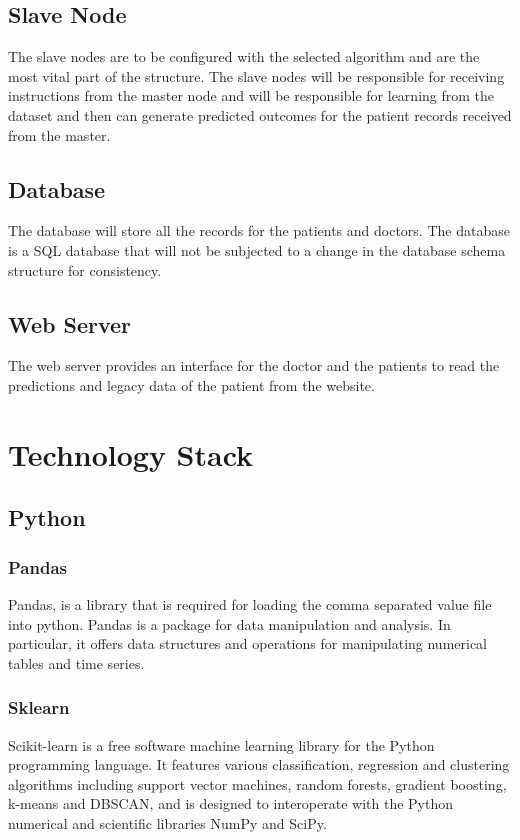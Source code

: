\documentclass[12pt]{article}
\begin{document}
\subsection{Slave Node}
The slave nodes are to be configured with the selected algorithm and are the most vital part of the structure. The slave nodes will be responsible for receiving instructions from the master node and will be responsible for learning from the dataset and then can generate predicted outcomes for the patient records received from the master. 

\subsection{Database}
The database will store all the records for the patients and doctors. The database is a SQL database that will not be subjected to a change in the database schema structure for consistency.

\subsection{Web Server}
The web server provides an interface for the doctor and the patients to read the predictions and legacy data of the patient from the website.

\newpage
\section{Technology Stack}
\subsection{Python}
\subsubsection{Pandas}
Pandas, is a library that is required for loading the comma separated value file into python. Pandas is a package for data manipulation and analysis. In particular, it offers data structures and operations for manipulating numerical tables and time series.

\subsubsection{Sklearn}
Scikit-learn is a free software machine learning library for the Python programming language. It features various classification, regression and clustering algorithms including support vector machines, random forests, gradient boosting, k-means and DBSCAN, and is designed to interoperate with the Python numerical and scientific libraries NumPy and SciPy.
\end{document}
